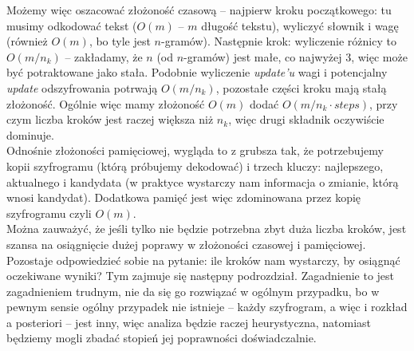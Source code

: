 \documentclass[a4paper]{article}
\theoremstyle{defn}
\theoremstyle{theorem}
\theoremstyle{lemma}
\theoremstyle{cor}
\theoremstyle{fact}
\begin{document}
Możemy więc oszacować złożoność czasową – najpierw kroku początkowego: tu musimy odkodować tekst ($O(m)$ – $m$ długość tekstu), wyliczyć słownik i wagę (również  $O(m)$, bo tyle jest $n$-gramów). Następnie krok: wyliczenie różnicy to $O(m/n_k)$ – zakładamy, że $n$ (od $n$-gramów) jest małe, co najwyżej 3, więc może być potraktowane jako stała. Podobnie wyliczenie \textit{update'u} wagi i potencjalny \textit{update} odszyfrowania potrwają $O(m/n_k)$, pozostałe części kroku mają stałą złożoność. Ogólnie więc mamy złożoność $O(m)$ dodać $O(m/n_k \cdot steps)$, przy czym liczba kroków jest raczej większa niż $n_k$, więc drugi składnik oczywiście dominuje.\\
Odnośnie złożoności pamięciowej, wygląda to z grubsza tak, że potrzebujemy kopii szyfrogramu (którą próbujemy dekodować) i trzech kluczy: najlepszego, aktualnego i kandydata (w praktyce wystarczy nam informacja o zmianie, którą wnosi kandydat). Dodatkowa pamięć jest więc zdominowana przez kopię szyfrogramu czyli $O(m)$.\\

Można zauważyć, że jeśli tylko nie będzie potrzebna zbyt duża liczba kroków, jest szansa na osiągnięcie dużej poprawy w złożoności czasowej i pamięciowej. Pozostaje odpowiedzieć sobie na pytanie: ile kroków nam wystarczy, by osiągnąć oczekiwane wyniki? Tym zajmuje się następny podrozdział. Zagadnienie to jest zagadnieniem trudnym, nie da się go rozwiązać w ogólnym przypadku, bo w pewnym sensie ogólny przypadek nie istnieje – każdy szyfrogram, a więc i rozkład a posteriori – jest inny, więc analiza będzie raczej heurystyczna, natomiast będziemy mogli zbadać stopień jej poprawności doświadczalnie.
\end{document}
